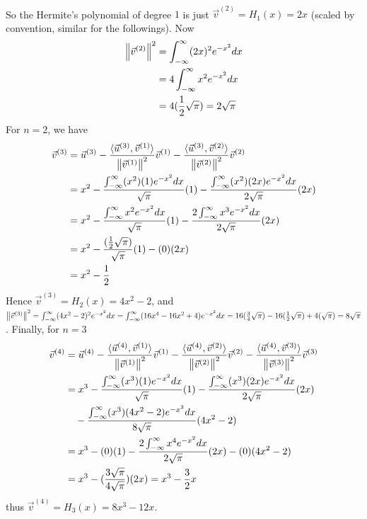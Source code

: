 \begin{solution}
\begin{align*}
\end{align*}
So the Hermite's polynomial of degree $1$ is just $\vec{v}^{(2)} = H_1(x) = 2x$ (scaled by convention, similar for the followings). Now
\begin{align*}
\norm{\vec{v}^{(2)}}^2 &= \int_{-\infty}^{\infty} (2x)^2 e^{-x^2} dx \\
&= 4\int_{-\infty}^{\infty} x^2 e^{-x^2} dx \\
&= 4(\frac{1}{2}\sqrt{\pi}) = 2\sqrt{\pi}
\end{align*}
For $n=2$, we have
\begin{align*}
\vec{v}^{(3)} &= \vec{u}^{(3)} - \frac{\langle\vec{u}^{(3)}, \vec{v}^{(1)}\rangle}{\norm{\vec{v}^{(1)}}^2} \vec{v}^{(1)} - \frac{\langle\vec{u}^{(3)}, \vec{v}^{(2)}\rangle}{\norm{\vec{v}^{(2)}}^2} \vec{v}^{(2)} \\
&= x^2 - \frac{\int_{-\infty}^{\infty} (x^2)(1) e^{-x^2} dx}{\sqrt{\pi}} (1) - \frac{\int_{-\infty}^{\infty} (x^2)(2x) e^{-x^2} dx}{2\sqrt{\pi}} (2x) \\
&= x^2 - \frac{\int_{-\infty}^{\infty} x^2 e^{-x^2} dx}{\sqrt{\pi}} (1) - \frac{2 \int_{-\infty}^{\infty} x^3 e^{-x^2} dx}{2\sqrt{\pi}} (2x) \\
&= x^2 - \frac{(\frac{1}{2}\sqrt{\pi})}{\sqrt{\pi}} (1) - (0) (2x) \\
&= x^2 - \frac{1}{2}
\end{align*}
Hence $\vec{v}^{(3)} = H_2(x) = 4x^2 - 2$, and $\norm{\vec{v}^{(3)}}^2 = \int_{-\infty}^{\infty} (4x^2 - 2)^2 e^{-x^2} dx = \int_{-\infty}^{\infty} (16 x^4 - 16 x^2 + 4)e^{-x^2} dx = 16(\frac{3}{4}\sqrt{\pi}) - 16(\frac{1}{2}\sqrt{\pi}) + 4(\sqrt{\pi}) = 8\sqrt{\pi}$. Finally, for $n=3$
\begin{align*}
\vec{v}^{(4)} &= \vec{u}^{(4)} - \frac{\langle\vec{u}^{(4)}, \vec{v}^{(1)}\rangle}{\norm{\vec{v}^{(1)}}^2} \vec{v}^{(1)} - \frac{\langle\vec{u}^{(4)}, \vec{v}^{(2)}\rangle}{\norm{\vec{v}^{(2)}}^2} \vec{v}^{(2)} - \frac{\langle\vec{u}^{(4)}, \vec{v}^{(3)}\rangle}{\norm{\vec{v}^{(3)}}^2} \vec{v}^{(3)}\\  
&= x^3 - \frac{\int_{-\infty}^{\infty} (x^3)(1) e^{-x^2} dx}{\sqrt{\pi}} (1) - \frac{\int_{-\infty}^{\infty} (x^3)(2x) e^{-x^2} dx}{2\sqrt{\pi}} (2x) \\
&\quad - \frac{\int_{-\infty}^{\infty} (x^3)(4x^2 - 2) e^{-x^2} dx}{8\sqrt{\pi}} (4x^2 - 2) \\
&= x^3 - (0)(1) - \frac{2\int_{-\infty}^{\infty} x^4 e^{-x^2} dx}{2\sqrt{\pi}} (2x) - (0)(4x^2 - 2) \\
&= x^3 - (\frac{3\sqrt{\pi}}{4\sqrt{\pi}})(2x) = x^3 - \frac{3}{2}x
\end{align*}
thus $\vec{v}^{(4)} = H_3(x) = 8x^3 - 12x$.
\end{solution}

